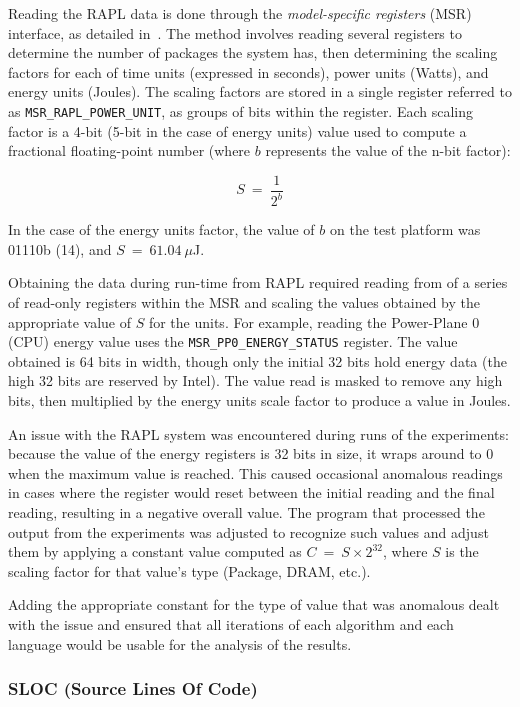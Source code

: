 Reading the RAPL data is done through the \textit{model-specific registers} (MSR) interface, as detailed in~\cite[Chapter~14]{intel}. The method involves reading several registers to determine the number of packages the system has, then determining the scaling factors for each of time units (expressed in seconds), power units (Watts), and energy units (Joules). The scaling factors are stored in a single register referred to as \texttt{MSR\_RAPL\_POWER\_UNIT}, as groups of bits within the register. Each scaling factor is a 4-bit (5-bit in the case of energy units) value used to compute a fractional floating-point number (where $b$ represents the value of the n-bit factor):

\[S~=~\frac{1}{2^{b}}\]

In the case of the energy units factor, the value of $b$ on the test platform was 01110b (14), and $S~=~61.04~\mu$J.

Obtaining the data during run-time from RAPL required reading from of a series of read-only registers within the MSR and scaling the values obtained by the appropriate value of $S$ for the units. For example, reading the Power-Plane 0 (CPU) energy value uses the \texttt{MSR\_PP0\_ENERGY\_STATUS} register. The value obtained is 64 bits in width, though only the initial 32 bits hold energy data (the high 32 bits are reserved by Intel). The value read is masked to remove any high bits, then multiplied by the energy units scale factor to produce a value in Joules.

An issue with the RAPL system was encountered during runs of the experiments: because the value of the energy registers is 32 bits in size, it wraps around to 0 when the maximum value is reached. This caused occasional anomalous readings in cases where the register would reset between the initial reading and the final reading, resulting in a negative overall value. The program that processed the output from the experiments was adjusted to recognize such values and adjust them by applying a constant value computed as $C~=~S \times 2^{32}$, where $S$ is the scaling factor for that value's type (Package, DRAM, etc.).

Adding the appropriate constant for the type of value that was anomalous dealt with the issue and ensured that all iterations of each algorithm and each language would be usable for the analysis of the results.

\subsubsection{SLOC (Source Lines Of Code)}

